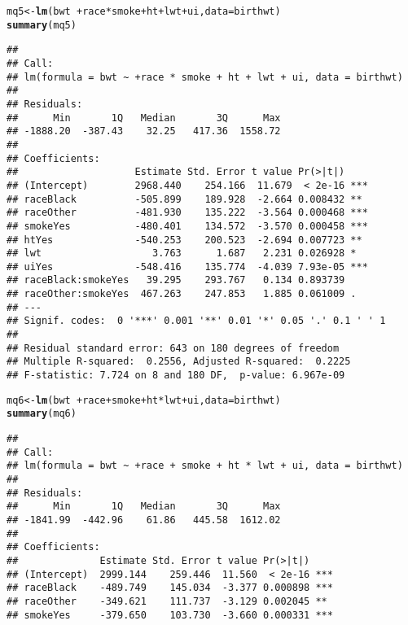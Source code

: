 \documentclass{article}\usepackage[]{graphicx}\usepackage[]{color}
\makeatletter
\newcommand{\hlopt}[1]{\textcolor[rgb]{0,0,0}{#1}}%
\newcommand{\hlstd}[1]{\textcolor[rgb]{0.345,0.345,0.345}{#1}}%
\newcommand{\hlkwb}[1]{\textcolor[rgb]{0.69,0.353,0.396}{#1}}%
\newcommand{\hlkwc}[1]{\textcolor[rgb]{0.333,0.667,0.333}{#1}}%
\newcommand{\hlkwd}[1]{\textcolor[rgb]{0.737,0.353,0.396}{\textbf{#1}}}%
\newenvironment{kframe}{%
 \def\at@end@of@kframe{}%
 \ifinner\ifhmode%
  \def\at@end@of@kframe{\end{minipage}}%
  \begin{minipage}{\columnwidth}%
 \fi\fi%
 \def\FrameCommand##1{\hskip\@totalleftmargin \hskip-\fboxsep
 \colorbox{shadecolor}{##1}\hskip-\fboxsep
     \hskip-\linewidth \hskip-\@totalleftmargin \hskip\columnwidth}%
 \MakeFramed {\advance\hsize-\width
   \@totalleftmargin\z@ \linewidth\hsize
   \@setminipage}}%
 {\par\unskip\endMakeFramed%
 \at@end@of@kframe}
\newenvironment{knitrout}{}{} %
\makeatother
\begin{document}
\begin{knitrout}
\color{fgcolor}\begin{kframe}
\begin{alltt}
\hlstd{mq5} \hlkwb{<-} \hlkwd{lm}\hlstd{(bwt} \hlopt{~  +} \hlstd{race} \hlopt{*} \hlstd{smoke} \hlopt{+} \hlstd{ht} \hlopt{+} \hlstd{lwt} \hlopt{+} \hlstd{ui ,}\hlkwc{data}\hlstd{=birthwt)}
\hlkwd{summary}\hlstd{(mq5)}
\end{alltt}
\begin{verbatim}
## 
## Call:
## lm(formula = bwt ~ +race * smoke + ht + lwt + ui, data = birthwt)
## 
## Residuals:
##      Min       1Q   Median       3Q      Max 
## -1888.20  -387.43    32.25   417.36  1558.72 
## 
## Coefficients:
##                    Estimate Std. Error t value Pr(>|t|)    
## (Intercept)        2968.440    254.166  11.679  < 2e-16 ***
## raceBlack          -505.899    189.928  -2.664 0.008432 ** 
## raceOther          -481.930    135.222  -3.564 0.000468 ***
## smokeYes           -480.401    134.572  -3.570 0.000458 ***
## htYes              -540.253    200.523  -2.694 0.007723 ** 
## lwt                   3.763      1.687   2.231 0.026928 *  
## uiYes              -548.416    135.774  -4.039 7.93e-05 ***
## raceBlack:smokeYes   39.295    293.767   0.134 0.893739    
## raceOther:smokeYes  467.263    247.853   1.885 0.061009 .  
## ---
## Signif. codes:  0 '***' 0.001 '**' 0.01 '*' 0.05 '.' 0.1 ' ' 1
## 
## Residual standard error: 643 on 180 degrees of freedom
## Multiple R-squared:  0.2556,	Adjusted R-squared:  0.2225 
## F-statistic: 7.724 on 8 and 180 DF,  p-value: 6.967e-09
\end{verbatim}
\begin{alltt}
\hlstd{mq6} \hlkwb{<-} \hlkwd{lm}\hlstd{(bwt} \hlopt{~  +} \hlstd{race} \hlopt{+} \hlstd{smoke} \hlopt{+} \hlstd{ht} \hlopt{*} \hlstd{lwt} \hlopt{+} \hlstd{ui ,}\hlkwc{data}\hlstd{=birthwt)}
\hlkwd{summary}\hlstd{(mq6)}
\end{alltt}
\begin{verbatim}
## 
## Call:
## lm(formula = bwt ~ +race + smoke + ht * lwt + ui, data = birthwt)
## 
## Residuals:
##      Min       1Q   Median       3Q      Max 
## -1841.99  -442.96    61.86   445.58  1612.02 
## 
## Coefficients:
##              Estimate Std. Error t value Pr(>|t|)    
## (Intercept)  2999.144    259.446  11.560  < 2e-16 ***
## raceBlack    -489.749    145.034  -3.377 0.000898 ***
## raceOther    -349.621    111.737  -3.129 0.002045 ** 
## smokeYes     -379.650    103.730  -3.660 0.000331 ***

\end{verbatim}
\end{kframe}
\end{knitrout}
\end{document}
